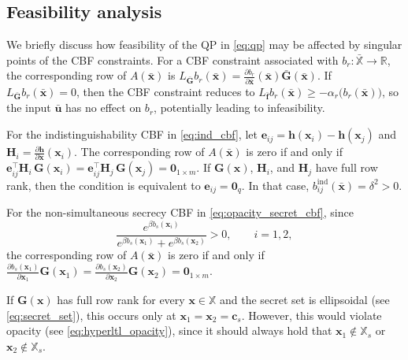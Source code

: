 \documentclass[journal,twoside,web]{ieeecolor}
\begin{document}
\subsection{Feasibility analysis}

We briefly discuss how feasibility of the QP in \eqref{eq:qp} may be affected by singular points of the CBF constraints. For a CBF constraint associated with $b_r:\bar{\mathbb{X}} \to \mathbb{R}$, the corresponding row of $A(\bar{\mathbf{x}})$ is $L_{\bar{\mathbf{G}}} b_r(\bar{\mathbf{x}}) = \frac{\partial b_r}{\partial \bar{\mathbf{x}}}(\bar{\mathbf{x}}) \bar{\mathbf{G}}(\bar{\mathbf{x}})$. If $L_{\bar{\mathbf{G}}} b_r(\bar{\mathbf{x}}) = 0$, then the CBF constraint reduces to $L_{\bar{\mathbf{f}}} b_r(\bar{\mathbf{x}}) \ge -\alpha_r\big(b_r(\bar{\mathbf{x}})\big)$, so the input $\bar{\mathbf{u}}$ has no effect on $b_r$, potentially leading to infeasibility.

For the indistinguishability CBF in \eqref{eq:ind_cbf}, let $\mathbf{e}_{ij} = \mathbf{h}(\mathbf{x}_i)-\mathbf{h}(\mathbf{x}_j)$ and $\mathbf{H}_i = \frac{\partial \mathbf{h}}{\partial \mathbf{x}}(\mathbf{x}_i)$. The corresponding row of $A(\bar{\mathbf{x}})$ is zero if and only if $\mathbf{e}_{ij}^\top \mathbf{H}_i \, \mathbf{G}(\mathbf{x}_i) = \mathbf{e}_{ij}^\top \mathbf{H}_j \, \mathbf{G}(\mathbf{x}_j) = \mathbf{0}_{1 \times m}$. If $\mathbf{G}(\mathbf{x})$, $\mathbf{H}_i$, and $\mathbf{H}_j$ have full row rank, then the condition is equivalent to $\mathbf{e}_{ij} = \mathbf{0}_q$. In that case, $b_{ij}^\textrm{ind}(\bar{\mathbf{x}}) = \delta^2 > 0$.

For the non-simultaneous secrecy CBF in \eqref{eq:opacity_secret_cbf}, since
\[
    \frac{e^{\beta b_s(\mathbf{x}_i)}}
    {e^{\beta b_s(\mathbf{x}_1)}+e^{\beta b_s(\mathbf{x}_2)}} > 0,
    \qquad i=1,2,
\]
the corresponding row of
$A(\bar{\mathbf{x}})$ is zero if and only if $\frac{\partial b_s(\mathbf{x}_1)}{\partial \mathbf{x}_1} \mathbf{G}(\mathbf{x}_1) = \frac{\partial b_s(\mathbf{x}_2)}{\partial \mathbf{x}_2} \mathbf{G}(\mathbf{x}_2) = \mathbf{0}_{1 \times m}$.

If $\mathbf{G}(\mathbf{x})$ has full row rank for every $\mathbf{x} \in \mathbb{X}$ and the secret set is ellipsoidal (see \eqref{eq:secret_set}), this occurs only at $\mathbf{x}_1=\mathbf{x}_2=\mathbf{c}_s$. However, this would violate opacity (see \eqref{eq:hyperltl_opacity}), since it should always hold that $\mathbf{x}_1 \notin \mathbb{X}_s$ or $\mathbf{x}_2 \notin \mathbb{X}_s$.
\end{document}

